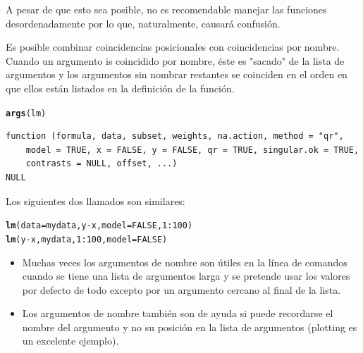 \documentclass{article}\usepackage[]{graphicx}\usepackage[]{color}
\makeatletter
\newcommand{\hlnum}[1]{\textcolor[rgb]{0.686,0.059,0.569}{#1}}%
\newcommand{\hlopt}[1]{\textcolor[rgb]{0,0,0}{#1}}%
\newcommand{\hlstd}[1]{\textcolor[rgb]{0.345,0.345,0.345}{#1}}%
\newcommand{\hlkwc}[1]{\textcolor[rgb]{0.333,0.667,0.333}{#1}}%
\newcommand{\hlkwd}[1]{\textcolor[rgb]{0.737,0.353,0.396}{\textbf{#1}}}%
\newenvironment{kframe}{%
 \def\at@end@of@kframe{}%
 \ifinner\ifhmode%
  \def\at@end@of@kframe{\end{minipage}}%
  \begin{minipage}{\columnwidth}%
 \fi\fi%
 \def\FrameCommand##1{\hskip\@totalleftmargin \hskip-\fboxsep
 \colorbox{shadecolor}{##1}\hskip-\fboxsep
     \hskip-\linewidth \hskip-\@totalleftmargin \hskip\columnwidth}%
 \MakeFramed {\advance\hsize-\width
   \@totalleftmargin\z@ \linewidth\hsize
   \@setminipage}}%
 {\par\unskip\endMakeFramed%
 \at@end@of@kframe}
\newenvironment{knitrout}{}{} %
\makeatother
\begin{document}
  A pesar de que esto sea posible, no es recomendable manejar las funciones desordenadamente por lo que, naturalmente, causará confusión.


  Es posible combinar coincidencias posicionales con coincidencias por nombre. Cuando un argumento is coincidido por nombre, éste es "sacado" de la lista de argumentos y los argumentos sin nombrar restantes se coinciden en el orden en que ellos están listados en la definición de la función.
\begin{knitrout}
\color{fgcolor}\begin{kframe}
\begin{alltt}
  \hlkwd{args}\hlstd{(lm)}
\end{alltt}
\begin{verbatim}
function (formula, data, subset, weights, na.action, method = "qr", 
    model = TRUE, x = FALSE, y = FALSE, qr = TRUE, singular.ok = TRUE, 
    contrasts = NULL, offset, ...) 
NULL
\end{verbatim}
\end{kframe}
\end{knitrout}

  Los siguientes dos llamados son similares:
\begin{knitrout}
\color{fgcolor}\begin{kframe}
\begin{alltt}
  \hlkwd{lm}\hlstd{(}\hlkwc{data} \hlstd{= mydata, y} \hlopt{-} \hlstd{x,} \hlkwc{model} \hlstd{=} \hlnum{FALSE}\hlstd{,} \hlnum{1}\hlopt{:}\hlnum{100}\hlstd{)}
  \hlkwd{lm}\hlstd{(y} \hlopt{-} \hlstd{x, mydata,} \hlnum{1}\hlopt{:}\hlnum{100}\hlstd{,} \hlkwc{model} \hlstd{=} \hlnum{FALSE}\hlstd{)}
\end{alltt}
\end{kframe}
\end{knitrout}
  
  \begin{itemize}
    \item Muchas veces los argumentos de nombre son útiles  en la línea de comandos cuando se tiene una lista de argumentos larga y se pretende usar los valores por defecto de todo excepto por un argumento cercano al final de la lista.  
    \item Los argumentos de nombre también son de ayuda si puede recordarse el nombre del argumento y no su posición en la lista de argumentos (plotting es un excelente ejemplo).
\end{itemize}
\end{document}
